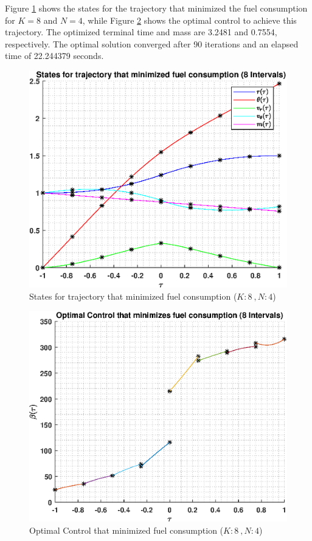 \documentclass[]{article}
\begin{document}
\vspace{2mm}\newline 
Figure \ref{fig:directStatesK8Poly4} shows the states for the trajectory that minimized the fuel consumption for \(K = 8\) and  \(N = 4\), while Figure \ref{fig:directControlK8Poly4} shows the optimal control to achieve this trajectory. The optimized terminal time and mass are 3.2481 and 0.7554, respectively. The optimal solution converged after 90 iterations and an elapsed time of 22.244379 seconds.
\begin{figure}
	\centering
	\includegraphics[scale=0.75]{directStatesK8Poly4.eps}
	\caption{States for trajectory that minimized fuel consumption (\(K:8\ , N:4\))}
	\label{fig:directStatesK8Poly4}
\end{figure}
\begin{figure}
	\centering
	\includegraphics[scale=0.75]{directControlK8Poly4.eps}
	\caption{Optimal Control that minimized fuel consumption (\(K:8\ , N:4\))}
	\label{fig:directControlK8Poly4}
\end{figure}
\end{document}
